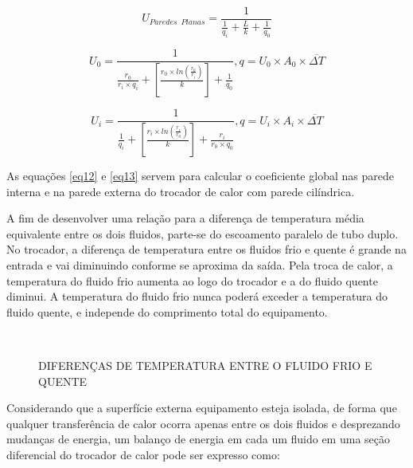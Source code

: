 \documentclass[a4paper,12pt,oneside]{article}
\begin{document}
\begin{flushright}
\begin{equation}\label{eq11}
	U_{Paredes\,\,\,Planas} = \frac{1}{\frac{1}{q_{i}} + \frac{L}{k} + \frac{1}{q_{0}}}
\end{equation}
\vspace{0.5cm}

\begin{equation}\label{eq12}
	U_{0} = \frac{1}{{\frac{r_{0}}{r_{i} \times q_{i}}} + \left[ \frac{r_{0} \times ln(\frac{r_{0}}{r_{i}})}{k}\right] + \frac{1}{q_{0}} } , q = U_{0} \times A_{0} \times \overline{\Delta T} 
\end{equation}
\vspace{0.5cm}

\begin{equation}\label{eq13}
	U_{i} = \frac{1}{\frac{1}{q_{i}} + \left[ \frac{r_{i} \times ln(\frac{r_{i}}{r_{0}})}{k}\right] + \frac{r_{i}}{r_{0} \times q_{0}} }, q = U_{i} \times A_{i} \times \overline{\Delta T}
\end{equation}
\vspace{0.5cm}

As equações \ref{eq12} e \ref{eq13} servem para calcular o coeficiente global nas parede interna e na parede externa do trocador de calor com parede cilíndrica.

A fim de desenvolver uma relação para a diferença de temperatura média equivalente entre os dois fluidos, parte-se do escoamento paralelo de tubo duplo. No trocador, a diferença de temperatura entre os fluidos frio e quente é grande na entrada e vai diminuindo conforme se aproxima da saída. Pela troca de calor, a temperatura do fluido frio aumenta ao logo do trocador e a do fluido quente diminui. A temperatura do fluido frio nunca poderá exceder a temperatura do fluido quente, e independe do comprimento total do equipamento.
\pagebreak
\clearpage
\newpage

\begin{figure}[h]
	
	\caption{DIFERENÇAS DE TEMPERATURA ENTRE O FLUIDO FRIO E QUENTE}
	\vspace{0.5cm}
	\vspace{0.5cm}\\
\end{figure}
\vspace{0.5cm}

Considerando que a superfície externa equipamento esteja isolada, de forma que qualquer transferência de calor ocorra apenas entre os dois fluidos e desprezando mudanças de energia, um balanço  de energia em cada um fluido em uma seção diferencial do trocador de calor pode ser expresso como:\\


\end{flushright}
\end{document}
